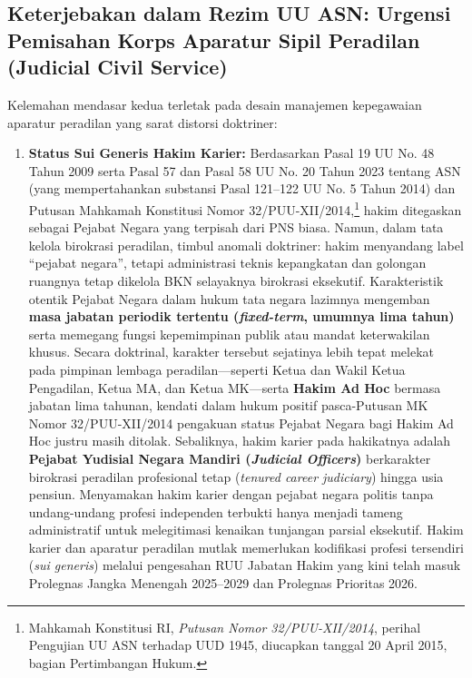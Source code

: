 \documentclass[12pt,a4paper,twocolumn]{article}
\begin{document}
\subsection{Keterjebakan dalam Rezim UU ASN: Urgensi Pemisahan Korps Aparatur Sipil Peradilan (Judicial Civil Service)}

Kelemahan mendasar kedua terletak pada desain manajemen kepegawaian aparatur peradilan yang sarat distorsi doktriner:

\begin{enumerate}
    \item \textbf{Status Sui Generis Hakim Karier:} Berdasarkan Pasal 19 UU No. 48 Tahun 2009 serta Pasal 57 dan Pasal 58 UU No. 20 Tahun 2023 tentang ASN (yang mempertahankan substansi Pasal 121--122 UU No. 5 Tahun 2014) dan Putusan Mahkamah Konstitusi Nomor 32/PUU-XII/2014,\footnote{Mahkamah Konstitusi RI, \textit{Putusan Nomor 32/PUU-XII/2014}, perihal Pengujian UU ASN terhadap UUD 1945, diucapkan tanggal 20 April 2015, bagian Pertimbangan Hukum.} hakim ditegaskan sebagai Pejabat Negara yang terpisah dari PNS biasa. Namun, dalam tata kelola birokrasi peradilan, timbul anomali doktriner: hakim menyandang label ``pejabat negara'', tetapi administrasi teknis kepangkatan dan golongan ruangnya tetap dikelola BKN selayaknya birokrasi eksekutif. Karakteristik otentik Pejabat Negara dalam hukum tata negara lazimnya mengemban \textbf{masa jabatan periodik tertentu (\textit{fixed-term}, umumnya lima tahun)} serta memegang fungsi kepemimpinan publik atau mandat keterwakilan khusus. Secara doktrinal, karakter tersebut sejatinya lebih tepat melekat pada pimpinan lembaga peradilan—seperti Ketua dan Wakil Ketua Pengadilan, Ketua MA, dan Ketua MK—serta \textbf{Hakim Ad Hoc} bermasa jabatan lima tahunan, kendati dalam hukum positif pasca-Putusan MK Nomor 32/PUU-XII/2014 pengakuan status Pejabat Negara bagi Hakim Ad Hoc justru masih ditolak. Sebaliknya, hakim karier pada hakikatnya adalah \textbf{Pejabat Yudisial Negara Mandiri (\textit{Judicial Officers})} berkarakter birokrasi peradilan profesional tetap (\textit{tenured career judiciary}) hingga usia pensiun. Menyamakan hakim karier dengan pejabat negara politis tanpa undang-undang profesi independen terbukti hanya menjadi tameng administratif untuk melegitimasi kenaikan tunjangan parsial eksekutif. Hakim karier dan aparatur peradilan mutlak memerlukan kodifikasi profesi tersendiri (\textit{sui generis}) melalui pengesahan RUU Jabatan Hakim yang kini telah masuk Prolegnas Jangka Menengah 2025--2029 dan Prolegnas Prioritas 2026.

\end{enumerate}
\end{document}
